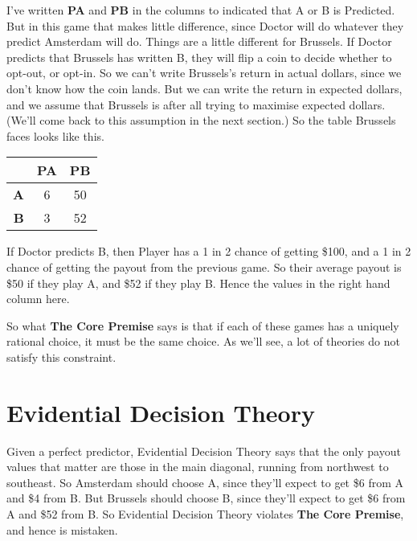 \documentclass[
  12pt,
]{article}
\begin{document}
I've written \textbf{PA} and \textbf{PB} in the columns to indicated
that A or B is Predicted. But in this game that makes little difference,
since Doctor will do whatever they predict Amsterdam will do. Things are
a little different for Brussels. If Doctor predicts that Brussels has
written B, they will flip a coin to decide whether to opt-out, or
opt-in. So we can't write Brussels's return in actual dollars, since we
don't know how the coin lands. But we can write the return in expected
dollars, and we assume that Brussels is after all trying to maximise
expected dollars. (We'll come back to this assumption in the next
section.) So the table Brussels faces looks like this.

\begin{table}[H]
\centering
\begin{tabular}[t]{>{}r|cc}

\textbf{ } & \textbf{PA} & \textbf{PB}\\
\midrule
\textbf{A} & 6 & 50\\
\textbf{B} & 3 & 52\\

\end{tabular}
\end{table}

If Doctor predicts B, then Player has a 1 in 2 chance of getting \$100,
and a 1 in 2 chance of getting the payout from the previous game. So
their average payout is \$50 if they play A, and \$52 if they play B.
Hence the values in the right hand column here.

So what \textbf{The Core Premise} says is that if each of these games
has a uniquely rational choice, it must be the same choice. As we'll
see, a lot of theories do not satisfy this constraint.

\hypertarget{evidential-decision-theory}{%
\section{Evidential Decision Theory}\label{evidential-decision-theory}}

Given a perfect predictor, Evidential Decision Theory says that the only
payout values that matter are those in the main diagonal, running from
northwest to southeast. So Amsterdam should choose A, since they'll
expect to get \$6 from A and \$4 from B. But Brussels should choose B,
since they'll expect to get \$6 from A and \$52 from B. So Evidential
Decision Theory violates \textbf{The Core Premise}, and hence is
mistaken.
\end{document}
